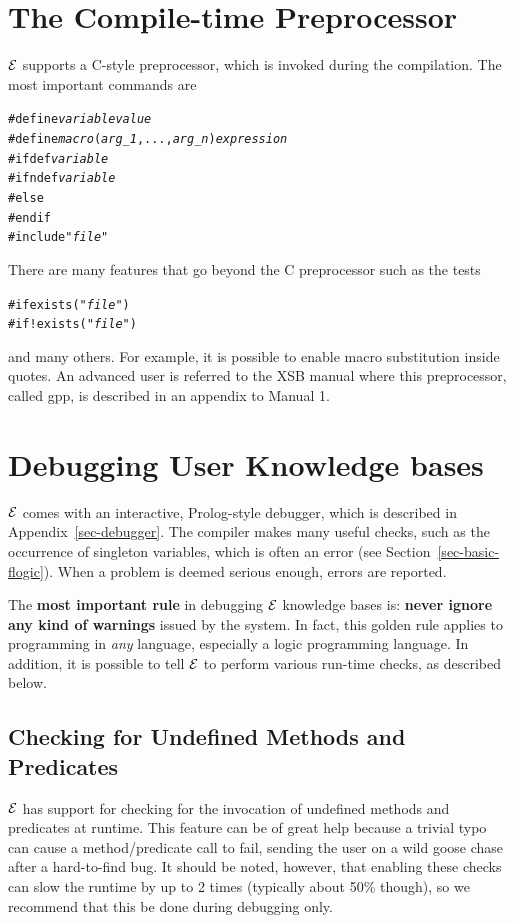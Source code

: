 \documentclass[11pt]{article}
\newcommand{\ERGO}{\mbox{\ensuremath{\cal{E}}\smaller{{\sc{RGO}}}}\xspace}
\newcommand{\FLSYSTEM}{\ERGO}
\begin{document}
\section{The Compile-time Preprocessor}\label{sec-gpp}

\FLSYSTEM supports a C-style preprocessor, which is invoked during the
compilation. The most important commands are
\begin{alltt}
   #define \emph{variable} \emph{value} 
   #define \emph{macro}(\emph{arg_1},...,\emph{arg_n}) \emph{expression} 
   #ifdef \emph{variable} 
   #ifndef \emph{variable} 
   #else
   #endif
   #include "\emph{file}" 
\end{alltt}
There are many features that go beyond the C preprocessor such as the tests
\begin{alltt}
   #if exists("\emph{file}") 
   #if !exists("\emph{file}") 
\end{alltt}
and many others. For example, it is possible to enable macro substitution
inside quotes. An advanced user is referred to the XSB manual where this
preprocessor, called gpp, is described in an appendix to Manual 1.


\section{Debugging User Knowledge bases}\label{sec-debugging}

\FLSYSTEM comes with an interactive, Prolog-style debugger, which is described
in Appendix~\ref{sec-debugger}. The compiler makes many useful checks, such
as the occurrence of singleton variables, which is often an error (see
Section~\ref{sec-basic-flogic}). When a problem is deemed serious enough,
errors are reported.

The \textbf{most important rule}  
in debugging \FLSYSTEM knowledge bases is: \textbf{never
  ignore any kind of warnings} issued by the system. In fact, this golden rule 
applies to programming in \emph{any} language, especially  a logic programming
language.  In addition, it is possible
to tell \FLSYSTEM to perform various run-time checks, as described below.

\subsection{Checking for Undefined Methods and Predicates}\label{sec-undef}

\FLSYSTEM has support for checking for the invocation of undefined methods and
predicates at runtime. This feature can be of great help because a trivial
typo can cause a method/predicate call to fail, sending the user on a
wild goose chase after a hard-to-find bug. It should be noted, however,
that enabling these checks can slow the runtime by up to 2 times (typically
about 50\% though), so we recommend that this be done during debugging only.
\end{document}
